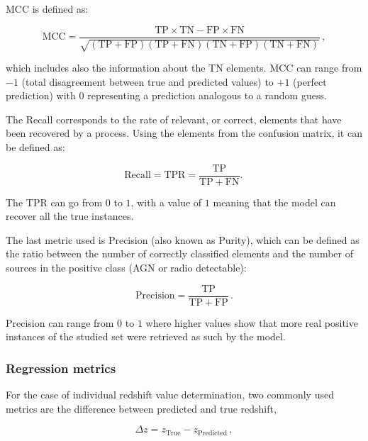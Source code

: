 \documentclass{aa}
\begin{document}
MCC is defined as:

\begin{equation}\label{eq:mcc}
\mathrm{MCC} = \frac{\mathrm{TP} \times \mathrm{TN} - \mathrm{FP} \times \mathrm{FN}}{\sqrt{(\mathrm{TP} + \mathrm{FP}) (\mathrm{TP} + \mathrm{FN}) (\mathrm{TN} + \mathrm{FP}) (\mathrm{TN} + \mathrm{FN})}}\,,
\end{equation}

\noindent which includes also the information about the TN elements. MCC can range from $-1$ (total disagreement between true and predicted values) to $+1$ (perfect prediction) with $0$ representing a prediction analogous to a random guess.

The Recall \citep[also called Completeness, Sensitivity, or True Positive Rate -TPR-;][]{10.2307/4586294} corresponds to the rate of relevant, or correct, elements that have been recovered by a process. Using the elements from the confusion matrix, it can be defined as:

\begin{equation}\label{eq:recall}
\mathrm{Recall} = \mathrm{TPR} = \frac{\mathrm{TP}}{\mathrm{TP} + \mathrm{FN}}.\,
\end{equation}

The TPR can go from $0$ to $1$, with a value of $1$ meaning that the model can recover all the true instances. 

The last metric used is Precision (also known as Purity), which can be defined as the ratio between the number of correctly classified elements and the number of sources in the positive class (AGN or radio detectable): 

\begin{equation}\label{eq:precision}
\mathrm{Precision} = \frac{\mathrm{TP}}{\mathrm{TP} + \mathrm{FP}}\,.
\end{equation}

Precision can range from $0$ to $1$ where higher values show that more real positive instances of the studied set were retrieved as such by the model.

\subsubsection{Regression metrics}\label{sec:metrics_regression}

For the case of individual redshift value determination, two commonly used metrics are the difference between predicted and true redshift,

\begin{equation}
\Delta z = z_{\mathrm{True}} - z_{\mathrm{Predicted}}\,,
\end{equation}
\end{document}

